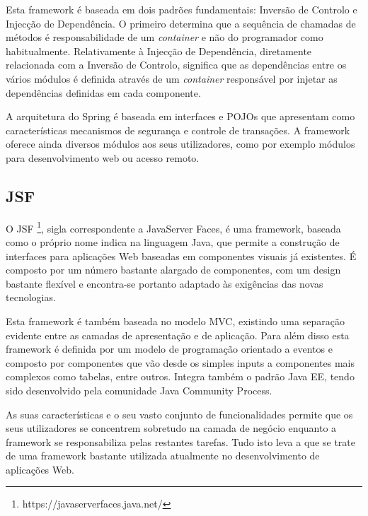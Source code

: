 Esta framework é baseada em dois padrões fundamentais: Inversão de Controlo e Injecção de Dependência. O primeiro determina que a sequência de chamadas de métodos é responsabilidade de um \textit{container} e não do programador como habitualmente. Relativamente à Injecção de Dependência, diretamente relacionada com a Inversão de Controlo, significa que as dependências entre os vários módulos é definida através de um \textit{container} responsável por injetar as dependências definidas em cada componente.

A arquitetura do Spring é baseada em interfaces e POJOs que apresentam como características mecanismos de segurança e controle de transações. A framework oferece ainda diversos módulos aos seus utilizadores, como por exemplo módulos para desenvolvimento web ou acesso remoto.

\subsection{JSF}

O JSF \footnote{https://javaserverfaces.java.net/}, sigla correspondente a JavaServer Faces, é uma framework, baseada como o próprio nome indica na linguagem Java, que permite a construção de interfaces para aplicações Web baseadas em componentes visuais já existentes. É composto por um número bastante alargado de componentes, com um design bastante flexível e encontra-se portanto adaptado às exigências das novas tecnologias.

Esta framework é também baseada no modelo MVC, existindo uma separação evidente entre as camadas de apresentação e de aplicação. Para além disso esta framework é definida por um modelo de programação orientado a eventos e composto por componentes que vão desde os simples inputs a componentes mais complexos como tabelas, entre outros. Integra também o padrão Java EE, tendo sido desenvolvido pela comunidade Java Community Process.

As suas características e o seu vasto conjunto de funcionalidades permite que os seus utilizadores se concentrem sobretudo na camada de negócio enquanto a framework se responsabiliza pelas restantes tarefas. Tudo isto leva a que se trate de uma framework bastante utilizada atualmente no desenvolvimento de aplicações Web.



